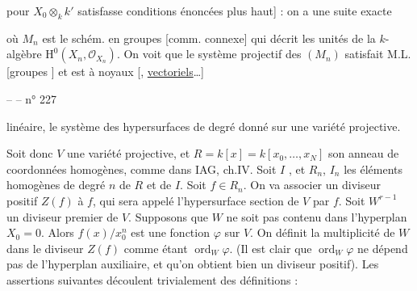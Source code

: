 

pour  $X_0\otimes_k k'$ satisfasse  conditions énoncées plus haut] : on a une suite exacte



où $M_n$ est le schém. en groupes [comm.  connexe]  qui décrit les unités de la $k$-algèbre  $\mathrm H^0(X_n,\mathcal O_{X_n})$. On voit que le système projectif des $(M_n)$ satisfait M.L. [groupes ] et est à noyaux  [, \uline{vectoriels}\ldots]



--  -- \hfill n° 227

linéaire, le système des hypersurfaces de degré donné sur une variété projective.

Soit donc $V$ une variété projective, et $R=k[x]=k[x_0,\ldots,x_N]$ son anneau de coordonnées homogènes, comme dans IAG, ch.IV. Soit $I$ , et $R_n$, $I_n$ les éléments homogènes de degré $n$ de $R$ et de $I$. Soit $f\in R_n$. On va associer un diviseur positif $Z(f)$ à $f$, qui sera appelé l'hypersurface section de $V$ par $f$. Soit $W^{r-1}$ un diviseur premier de $V$. Supposons que $W$ ne soit pas contenu dans l'hyperplan $X_0=0$. Alors $f(x)/x_0^n$ est une fonction $\varphi$ sur $V$. On définit la multiplicité de $W$ dans le diviseur $Z(f)$ comme étant $\operatorname{ord}_W\varphi$. (Il est clair que $\operatorname{ord}_W\varphi$ ne dépend pas de l'hyperplan auxiliaire, et qu'on obtient bien un diviseur positif). Les assertions suivantes découlent trivialement des définitions :

